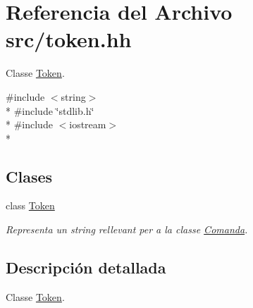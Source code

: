 \hypertarget{token_8hh}{}\section{Referencia del Archivo src/token.hh}
\label{token_8hh}


Classe \hyperlink{class_token}{Token}.  


{\ttfamily \#include $<$string$>$}\\*
{\ttfamily \#include \char`\"{}stdlib.\+h\char`\"{}}\\*
{\ttfamily \#include $<$iostream$>$}\\*
\subsection*{Clases}
\begin{DoxyCompactItemize}
\item 
class \hyperlink{class_token}{Token}
\begin{DoxyCompactList}\small\item\em Representa un string rellevant per a la classe \hyperlink{class_comanda}{Comanda}. \end{DoxyCompactList}\end{DoxyCompactItemize}


\subsection{Descripción detallada}
Classe \hyperlink{class_token}{Token}. 

